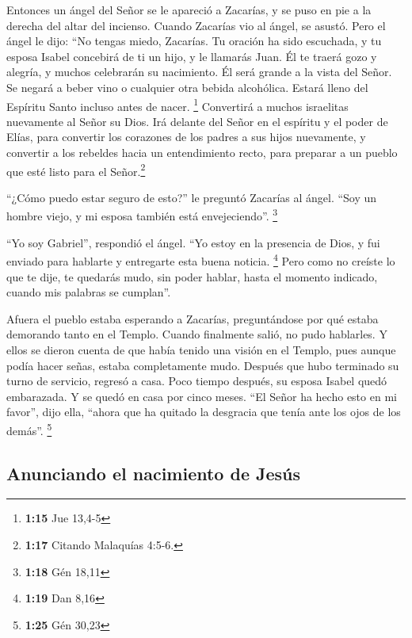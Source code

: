  Entonces un ángel del Señor se le apareció a Zacarías, y
se puso en pie a la derecha del altar del incienso. 
Cuando Zacarías vio al ángel, se asustó.  Pero el ángel
le dijo: ``No tengas miedo, Zacarías. Tu oración ha sido escuchada, y tu
esposa Isabel concebirá de ti un hijo, y le llamarás Juan.
 Él te traerá gozo y alegría, y muchos celebrarán su
nacimiento.  Él será grande a la vista del Señor. Se
negará a beber vino o cualquier otra bebida alcohólica. Estará lleno del
Espíritu Santo incluso antes de nacer. \footnote{\textbf{1:15} Jue
  13,4-5}  Convertirá a muchos israelitas nuevamente al
Señor su Dios.  Irá delante del Señor en el espíritu y el
poder de Elías, para convertir los corazones de los padres a sus hijos
nuevamente, y convertir a los rebeldes hacia un entendimiento recto,
para preparar a un pueblo que esté listo para el Señor.\footnote{\textbf{1:17}
  Citando Malaquías 4:5-6.}

 ``¿Cómo puedo estar seguro de esto?'' le preguntó
Zacarías al ángel. ``Soy un hombre viejo, y mi esposa también está
envejeciendo''. \footnote{\textbf{1:18} Gén 18,11}

 ``Yo soy Gabriel'', respondió el ángel. ``Yo estoy en la
presencia de Dios, y fui enviado para hablarte y entregarte esta buena
noticia. \footnote{\textbf{1:19} Dan 8,16}  Pero como no
creíste lo que te dije, te quedarás mudo, sin poder hablar, hasta el
momento indicado, cuando mis palabras se cumplan''.

 Afuera el pueblo estaba esperando a Zacarías,
preguntándose por qué estaba demorando tanto en el Templo.
 Cuando finalmente salió, no pudo hablarles. Y ellos se
dieron cuenta de que había tenido una visión en el Templo, pues aunque
podía hacer señas, estaba completamente mudo.  Después
que hubo terminado su turno de servicio, regresó a casa. 
Poco tiempo después, su esposa Isabel quedó embarazada. Y se quedó en
casa por cinco meses.  ``El Señor ha hecho esto en mi
favor'', dijo ella, ``ahora que ha quitado la desgracia que tenía ante
los ojos de los demás''. \footnote{\textbf{1:25} Gén 30,23}

\hypertarget{anunciando-el-nacimiento-de-jesuxfas}{%
\subsection{Anunciando el nacimiento de
Jesús}\label{anunciando-el-nacimiento-de-jesuxfas}}

